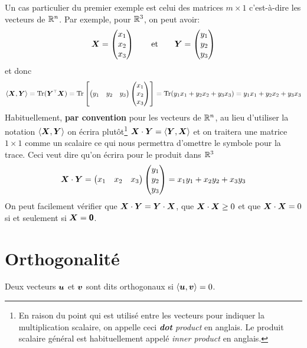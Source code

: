 Un cas particulier du premier exemple est celui des matrices $m\times 1$ c'est-à-dire les
vecteurs de $\mathbb{R}^n$. Par exemple, pour $\mathbb{R}^3$, on peut avoir:
\[
\boldsymbol{X} = \begin{pmatrix}
x_1 \\ x_2 \\ x_3
\end{pmatrix} \qquad\mbox{et}\qquad \boldsymbol{Y}= \begin{pmatrix}
y_1 \\ y_2 \\ y_3
\end{pmatrix}
\]
et donc
\[
\langle\matX, \matY\rangle = \tr(\transp{\matY}\matX) = \tr\left[ 
\begin{pmatrix}
y_1 & y_2 & y_3
\end{pmatrix}
\begin{pmatrix}
x_1 \\ x_2 \\ x_3
\end{pmatrix} \right]
= \tr(y_1 x_1 + y_2 x_2 + y_3 x_3) = y_1 x_1 + y_2 x_2 + y_3 x_3
\]
Habituellement, \textbf{par convention} pour les vecteurs de $\mathbb{R}^n$, 
au lieu d'utiliser la notation $\langle\boldsymbol{X}, \boldsymbol{Y}\rangle$ on
écrira plutôt\footnote{En raison du point qui est utilisé entre les vecteurs
pour indiquer la multiplication scalaire, on appelle ceci \textit{\textbf{dot} product} en 
anglais. Le produit scalaire général est habituellement appelé \textit{inner product} 
en anglais.} $\boldsymbol{X}\cdot\boldsymbol{Y} = \langle\boldsymbol{Y}, \boldsymbol{X}\rangle$ 
et on traitera une matrice $1\times 1$ comme un
scalaire ce qui nous permettra d'omettre le symbole pour la trace. Ceci veut
dire qu'on écrira pour le produit dans $\mathbb{R}^3$
\[
\boldsymbol{X}\cdot\boldsymbol{Y} = \begin{pmatrix}
x_1 & x_2 & x_3
\end{pmatrix}
\begin{pmatrix}
y_1 \\y_2 \\ y_3
\end{pmatrix} = x_1 y_1 + x_2 y_2 + x_3 y_3
\]
On peut facilement vérifier que $\boldsymbol{X}\cdot\boldsymbol{Y} = \boldsymbol{Y}\cdot\boldsymbol{X}$, que $\boldsymbol{X}\cdot\boldsymbol{X}\geq 0$ et que $\boldsymbol{X}\cdot\boldsymbol{X} = 0$ si et seulement si $\boldsymbol{X}=\mbox{\textsf{\textbf{{0}}}}$.
\section{Orthogonalité}
\begin{defini}
Deux vecteurs $\boldsymbol{u}$ et $\boldsymbol{v}$ sont dits orthogonaux si $\langle \boldsymbol{u}, \boldsymbol{v}\rangle = 0$.
\end{defini}

